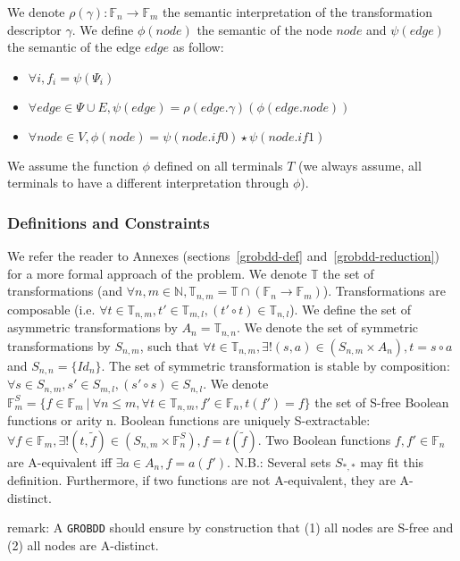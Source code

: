 \documentclass[a4paper,10pt]{article}
\newcommand{\N}{\mathbb{N}}%
\newcommand{\F}{\mathbb{F}}
\newcommand{\T}{\mathbb{T}}
\newcommand{\GroBdd}{\texttt{GROBDD}}
\begin{document}
We denote $\rho(\gamma) : \F_n \longrightarrow \F_m$ the semantic interpretation of the transformation descriptor $\gamma$.
We define $\phi(node)$ the semantic of the node $node$ and $\psi(edge)$ the semantic of the edge $edge$ as follow:\begin{itemize}
\item $\forall i, f_i = \psi(\Psi_i)$
\item $\forall edge \in \Psi \cup E, \psi(edge) = \rho(edge.\gamma)(\phi(edge.\mathit{node}))$
\item $\forall node \in V, \phi(node) = \psi(node.\mathit{if0}) \star \psi(node.\mathit{if1})$
\end{itemize}
We assume the function $\phi$ defined on all terminals $T$ (we always assume, all terminals to have a different interpretation through $\phi$).

\subsubsection{Definitions and Constraints}

We refer the reader to Annexes (sections~\ref{grobdd-def} and~\ref{grobdd-reduction}) for a more formal approach of the problem.
We denote $\T$ the set of transformations (and $\forall n, m\in\N, \T_{n, m} = \T \cap (\F_n \longrightarrow \F_m)$).
Transformations are composable (i.e. $\forall t\in\T_{n, m}, t'\in\T_{m ,l}, (t' \circ t) \in \T_{n, l}$).
We define the set of asymmetric transformations by $A_n = \T_{n, n}$.
We denote the set of symmetric transformations by $S_{n, m}$, such that $\forall t\in\T_{n, m}, \exists!(s, a)\in(S_{n, m}\times A_n), t = s \circ a$ and $S_{n, n} = \{Id_n\}$.
The set of symmetric transformation is stable by composition: $\forall s\in S_{n, m}, s'\in S_{m ,l}, (s' \circ s) \in S_{n, l}$.
We denote $\F^S_m = \{f\in\F_m~|~\forall n \leq m, \forall t\in\T_{n, m}, f'\in\F_n, t(f') = f\}$ the set of S-free Boolean functions or arity n.
Boolean functions are uniquely S-extractable: $\forall f\in\F_m, \exists! (t, \tilde{f})\in \left( S_{n, m} \times \F^S_n \right), f = t(\tilde{f})$.
Two Boolean functions $f, f'\in\F_n$ are A-equivalent iff $\exists a\in A_n, f=a(f')$.
N.B.: Several sets $S_{*, *}$ may fit this definition.
Furthermore, if two functions are not A-equivalent, they are A-distinct.

remark: A \GroBdd{} should ensure by construction that (1) all nodes are S-free and (2) all nodes are A-distinct.
\end{document}
